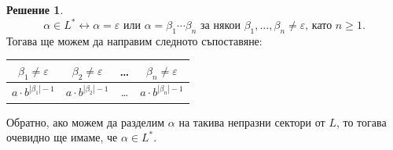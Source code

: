 \documentclass[12pt]{article}
\theoremstyle{definition}
\newtheorem*{solution}{Решение}
\begin{document}
\begin{solution}
\[
  \alpha \in L^* \longleftrightarrow \alpha = \varepsilon \text{ или } \alpha = \beta_1 \cdots \beta_n \text{ за някои } \beta_1, \dots, \beta_n \neq \varepsilon \text{, като } n \geq 1.
\]
Тогава ще можем да направим следното съпоставяне:
\begin{center}
  \begin{tabular}{|c|c|c|c|}
    \hline
    $\beta_1 \neq \varepsilon$ & $\beta_2 \neq \varepsilon$ & \dots & $\beta_n \neq \varepsilon$ \\
    \hline
    $a \cdot b^{|\beta_1| - 1}$ & $a \cdot b^{|\beta_2| - 1}$ & \dots & $a \cdot b^{|\beta_n| - 1}$ \\
    \hline
  \end{tabular}
\end{center}
Обратно, ако можем да разделим $\alpha$ на такива непразни сектори от $L$, то тогава очевидно ще имаме, че $\alpha \in L^*$.


\end{solution}
\end{document}
